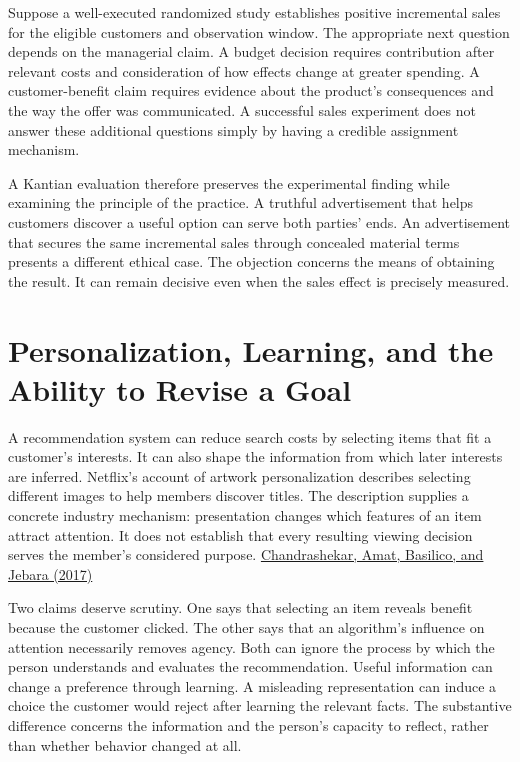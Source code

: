 Suppose a well-executed randomized study establishes positive
incremental sales for the eligible customers and observation window. The
appropriate next question depends on the managerial claim. A budget
decision requires contribution after relevant costs and consideration of
how effects change at greater spending. A customer-benefit claim
requires evidence about the product's consequences and the way the offer
was communicated. A successful sales experiment does not answer these
additional questions simply by having a credible assignment mechanism.

A Kantian evaluation therefore preserves the experimental finding while
examining the principle of the practice. A truthful advertisement that
helps customers discover a useful option can serve both parties' ends.
An advertisement that secures the same incremental sales through
concealed material terms presents a different ethical case. The
objection concerns the means of obtaining the result. It can remain
decisive even when the sales effect is precisely measured.


\hypertarget{M09-personalization-learning-and-the-ability-to-revise-a-goal}{%
\section{Personalization, Learning, and the Ability to Revise a
Goal}\label{M09-personalization-learning-and-the-ability-to-revise-a-goal}}

\noindent \noindent A recommendation system can reduce search costs by selecting
items that fit a customer's interests. It can also shape the information
from which later interests are inferred. Netflix's account of artwork
personalization describes selecting different images to help members
discover titles. The description supplies a concrete industry mechanism:
presentation changes which features of an item attract attention. It
does not establish that every resulting viewing decision serves the
member's considered purpose.
\href{https://netflixtechblog.com/artwork-personalization-c589f074ad76}{Chandrashekar,
Amat, Basilico, and Jebara (2017)}

Two claims deserve scrutiny. One says that selecting an item reveals
benefit because the customer clicked. The other says that an algorithm's
influence on attention necessarily removes agency. Both can ignore the
process by which the person understands and evaluates the
recommendation. Useful information can change a preference through
learning. A misleading representation can induce a choice the customer
would reject after learning the relevant facts. The substantive
difference concerns the information and the person's capacity to
reflect, rather than whether behavior changed at all.

